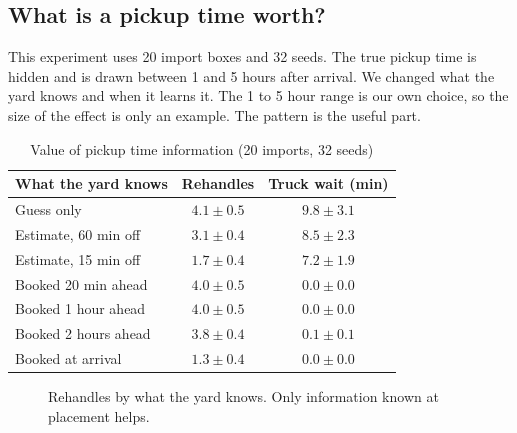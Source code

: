 \documentclass[conference]{IEEEtran}
\begin{document}
\subsection{What is a pickup time worth?}
This experiment uses 20 import boxes and 32 seeds. The true pickup time is hidden and is drawn between 1 and 5 hours after arrival. We changed what the yard knows and when it learns it. The 1 to 5 hour range is our own choice, so the size of the effect is only an example. The pattern is the useful part.

\begin{table}[t]
\caption{Value of pickup time information (20 imports, 32 seeds)}
\label{tab:info}
\centering
\small
\begin{tabular}{lcc}
\toprule
What the yard knows & Rehandles & Truck wait (min) \\
\midrule
Guess only & $4.1\pm0.5$ & $9.8\pm3.1$ \\
Estimate, 60 min off & $3.1\pm0.4$ & $8.5\pm2.3$ \\
Estimate, 15 min off & $1.7\pm0.4$ & $7.2\pm1.9$ \\
Booked 20 min ahead & $4.0\pm0.5$ & $0.0\pm0.0$ \\
Booked 1 hour ahead & $4.0\pm0.5$ & $0.0\pm0.0$ \\
Booked 2 hours ahead & $3.8\pm0.4$ & $0.1\pm0.1$ \\
Booked at arrival & $1.3\pm0.4$ & $0.0\pm0.0$ \\
\bottomrule
\end{tabular}
\end{table}

\begin{figure}[t]
\centering
{}
\caption{Rehandles by what the yard knows. Only information known at placement helps.}
\label{fig:info}
\end{figure}
\end{document}

